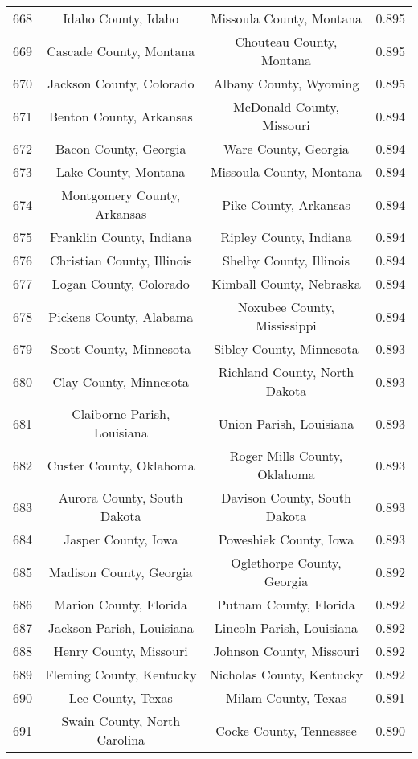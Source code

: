 \begin{longtable}{cccc}
  668 & Idaho County, Idaho & Missoula County, Montana & 0.895 \\ 
  669 & Cascade County, Montana & Chouteau County, Montana & 0.895 \\ 
  670 & Jackson County, Colorado & Albany County, Wyoming & 0.895 \\ 
  671 & Benton County, Arkansas & McDonald County, Missouri & 0.894 \\ 
  672 & Bacon County, Georgia & Ware County, Georgia & 0.894 \\ 
  673 & Lake County, Montana & Missoula County, Montana & 0.894 \\ 
  674 & Montgomery County, Arkansas & Pike County, Arkansas & 0.894 \\ 
  675 & Franklin County, Indiana & Ripley County, Indiana & 0.894 \\ 
  676 & Christian County, Illinois & Shelby County, Illinois & 0.894 \\ 
  677 & Logan County, Colorado & Kimball County, Nebraska & 0.894 \\ 
  678 & Pickens County, Alabama & Noxubee County, Mississippi & 0.894 \\ 
  679 & Scott County, Minnesota & Sibley County, Minnesota & 0.893 \\ 
  680 & Clay County, Minnesota & Richland County, North Dakota & 0.893 \\ 
  681 & Claiborne Parish, Louisiana & Union Parish, Louisiana & 0.893 \\ 
  682 & Custer County, Oklahoma & Roger Mills County, Oklahoma & 0.893 \\ 
  683 & Aurora County, South Dakota & Davison County, South Dakota & 0.893 \\ 
  684 & Jasper County, Iowa & Poweshiek County, Iowa & 0.893 \\ 
  685 & Madison County, Georgia & Oglethorpe County, Georgia & 0.892 \\ 
  686 & Marion County, Florida & Putnam County, Florida & 0.892 \\ 
  687 & Jackson Parish, Louisiana & Lincoln Parish, Louisiana & 0.892 \\ 
  688 & Henry County, Missouri & Johnson County, Missouri & 0.892 \\ 
  689 & Fleming County, Kentucky & Nicholas County, Kentucky & 0.892 \\ 
  690 & Lee County, Texas & Milam County, Texas & 0.891 \\ 
  691 & Swain County, North Carolina & Cocke County, Tennessee & 0.890 \\ 

\end{longtable}
